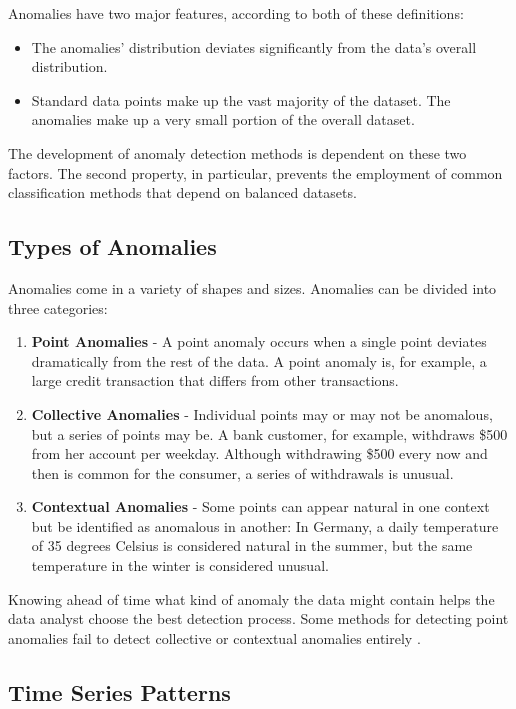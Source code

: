 Anomalies have two major features, according to both of these definitions:

\begin{itemize}
	\item The anomalies' distribution deviates significantly from the data's overall distribution.
	\item Standard data points make up the vast majority of the dataset. The anomalies make up a very small portion of the overall dataset.
\end{itemize}

The development of anomaly detection methods is dependent on these two factors. The second property, in particular, prevents the employment of common classification methods that depend on balanced datasets.

\subsection{Types of Anomalies}
Anomalies come in a variety of shapes and sizes. Anomalies can be divided into three categories:

\begin{enumerate}
	\item \textbf{Point Anomalies} - A point anomaly occurs when a single point deviates dramatically from the rest of the data.
	A point anomaly is, for example, a large credit transaction that differs from other transactions.
	\item \textbf{Collective Anomalies} - Individual points may or may not be anomalous, but a series of points may be. A bank customer, for example, withdraws \$500 from her account per weekday. Although withdrawing \$500 every now and then is common for the consumer, a series of withdrawals is unusual.
	\item \textbf{Contextual Anomalies} - Some points can appear natural in one context but be identified as anomalous in another: In Germany, a daily temperature of 35 degrees Celsius is considered natural in the summer, but the same temperature in the winter is considered unusual.
\end{enumerate}

Knowing ahead of time what kind of anomaly the data might contain helps the data analyst choose the best detection process. Some methods for detecting point anomalies fail to detect collective or contextual anomalies entirely \parencite{Braei2020}.

\subsection{Time Series Patterns}

